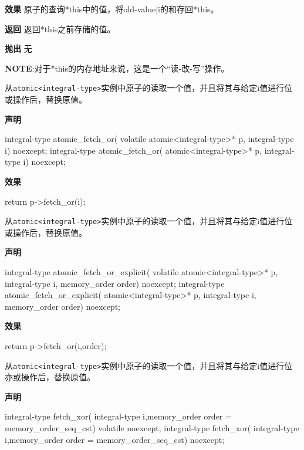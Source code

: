 \textbf{效果}
原子的查询*this中的值，将old-value|i的和存回*this。

\textbf{返回}
返回*this之前存储的值。

\textbf{抛出}
无

\textbf{NOTE}:对于*this的内存地址来说，这是一个“读-改-写”操作。


从\texttt{atomic<integral-type>}实例中原子的读取一个值，并且将其与给定i值进行位或操作后，替换原值。

\textbf{声明}

\begin{cpp}
integral-type atomic_fetch_or(
    volatile atomic<integral-type>* p, integral-type i) noexcept;
integral-type atomic_fetch_or(
    atomic<integral-type>* p, integral-type i) noexcept;
\end{cpp}

\textbf{效果}

\begin{cpp}
return p->fetch_or(i);
\end{cpp}


从\texttt{atomic<integral-type>}实例中原子的读取一个值，并且将其与给定i值进行位或操作后，替换原值。

\textbf{声明}

\begin{cpp}
integral-type atomic_fetch_or_explicit(
    volatile atomic<integral-type>* p, integral-type i,
    memory_order order) noexcept;
integral-type atomic_fetch_or_explicit(
    atomic<integral-type>* p, integral-type i, memory_order order)
    noexcept;
\end{cpp}

\textbf{效果}

\begin{cpp}
return p->fetch_or(i,order);
\end{cpp}


从\texttt{atomic<integral-type>}实例中原子的读取一个值，并且将其与给定i值进行位亦或操作后，替换原值。

\textbf{声明}

\begin{cpp}
integral-type fetch_xor(
    integral-type i,memory_order order = memory_order_seq_cst)
    volatile noexcept;
integral-type fetch_xor(
    integral-type i,memory_order order = memory_order_seq_cst) noexcept;
\end{cpp}


